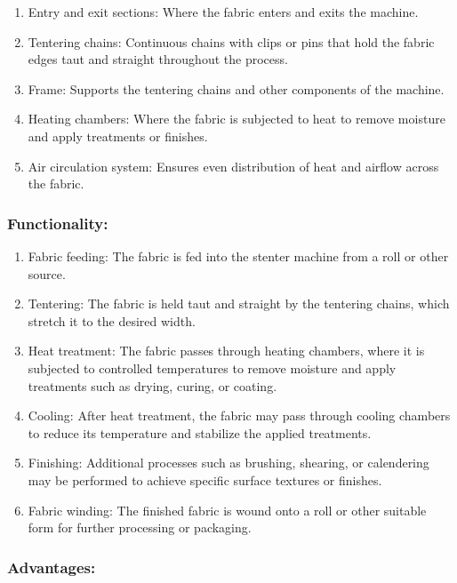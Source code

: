 \begin{enumerate}
\item
  Entry and exit sections: Where the fabric enters and exits the
  machine.
\item
  Tentering chains: Continuous chains with clips or pins that hold the
  fabric edges taut and straight throughout the process.
\item
  Frame: Supports the tentering chains and other components of the
  machine.
\item
  Heating chambers: Where the fabric is subjected to heat to remove
  moisture and apply treatments or finishes.
\item
  Air circulation system: Ensures even distribution of heat and airflow
  across the fabric.
\end{enumerate}

\subsubsection{Functionality:}

\begin{enumerate}
\item
  Fabric feeding: The fabric is fed into the stenter machine from a roll
  or other source.
\item
  Tentering: The fabric is held taut and straight by the tentering
  chains, which stretch it to the desired width.
\item
  Heat treatment: The fabric passes through heating chambers, where it
  is subjected to controlled temperatures to remove moisture and apply
  treatments such as drying, curing, or coating.
\item
  Cooling: After heat treatment, the fabric may pass through cooling
  chambers to reduce its temperature and stabilize the applied
  treatments.
\item
  Finishing: Additional processes such as brushing, shearing, or
  calendering may be performed to achieve specific surface textures or
  finishes.
\item
  Fabric winding: The finished fabric is wound onto a roll or other
  suitable form for further processing or packaging.
\end{enumerate}

\subsubsection{Advantages:}

